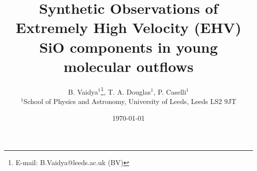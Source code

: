 \documentclass[useAMS,usenatbib]{mn2e}
\begin{document}
\title[EHV SiO components in Molecular Outflows]{Synthetic Observations of Extremely High Velocity (EHV) SiO components
  in young molecular outflows}
\author[B. Vaidya, T. Douglas, P. Caselli]{B. Vaidya$^{1}$\thanks{E-mail:
B.Vaidya@leeds.ac.uk (BV)}, T. A. Douglas$^{1}$, P. Caselli$^{1}$\\
$^{1}$School of Physics and Astronomy, University of Leeds, Leeds LS2
9JT\\
}

\date\today

\pagerange{\pageref{firstpage}--\pageref{lastpage}} 


\maketitle

\label{firstpage}
\end{document}

